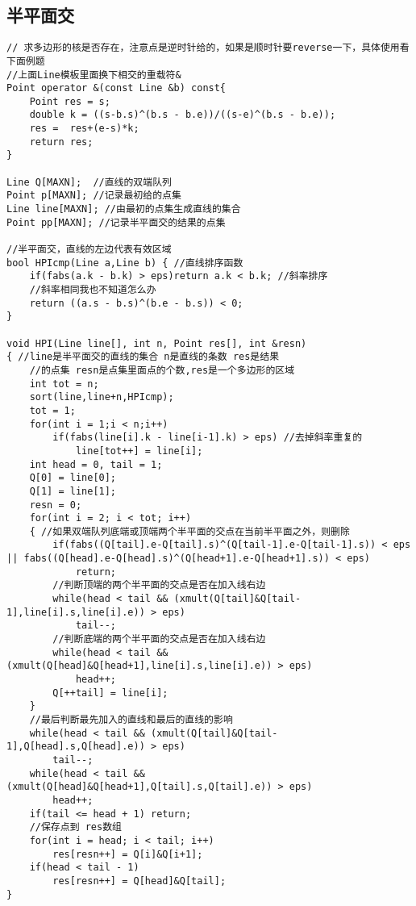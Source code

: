 \subsection{半平面交}
\begin{lstlisting}
// 求多边形的核是否存在，注意点是逆时针给的，如果是顺时针要reverse一下，具体使用看下面例题
//上面Line模板里面换下相交的重载符&
Point operator &(const Line &b) const{
	Point res = s;
	double k = ((s-b.s)^(b.s - b.e))/((s-e)^(b.s - b.e));
	res =  res+(e-s)*k;
	return res;
}

Line Q[MAXN];  //直线的双端队列
Point p[MAXN]; //记录最初给的点集
Line line[MAXN]; //由最初的点集生成直线的集合
Point pp[MAXN]; //记录半平面交的结果的点集

//半平面交，直线的左边代表有效区域
bool HPIcmp(Line a,Line b) { //直线排序函数
	if(fabs(a.k - b.k) > eps)return a.k < b.k; //斜率排序
	//斜率相同我也不知道怎么办
	return ((a.s - b.s)^(b.e - b.s)) < 0;
}

void HPI(Line line[], int n, Point res[], int &resn)
{ //line是半平面交的直线的集合 n是直线的条数 res是结果
	//的点集 resn是点集里面点的个数,res是一个多边形的区域
	int tot = n;
	sort(line,line+n,HPIcmp);
	tot = 1;
	for(int i = 1;i < n;i++)
		if(fabs(line[i].k - line[i-1].k) > eps) //去掉斜率重复的
			line[tot++] = line[i];
	int head = 0, tail = 1;
	Q[0] = line[0];
	Q[1] = line[1];
	resn = 0;
	for(int i = 2; i < tot; i++)
	{ //如果双端队列底端或顶端两个半平面的交点在当前半平面之外，则删除
		if(fabs((Q[tail].e-Q[tail].s)^(Q[tail-1].e-Q[tail-1].s)) < eps || fabs((Q[head].e-Q[head].s)^(Q[head+1].e-Q[head+1].s)) < eps)
			return;
		//判断顶端的两个半平面的交点是否在加入线右边
		while(head < tail && (xmult(Q[tail]&Q[tail-1],line[i].s,line[i].e)) > eps)
			tail--;
		//判断底端的两个半平面的交点是否在加入线右边
		while(head < tail && (xmult(Q[head]&Q[head+1],line[i].s,line[i].e)) > eps)
			head++;
		Q[++tail] = line[i];
	}
	//最后判断最先加入的直线和最后的直线的影响
	while(head < tail && (xmult(Q[tail]&Q[tail-1],Q[head].s,Q[head].e)) > eps)
		tail--;
	while(head < tail && (xmult(Q[head]&Q[head+1],Q[tail].s,Q[tail].e)) > eps)
		head++;
	if(tail <= head + 1) return;
	//保存点到 res数组
	for(int i = head; i < tail; i++)
		res[resn++] = Q[i]&Q[i+1];
	if(head < tail - 1)
		res[resn++] = Q[head]&Q[tail];
}
\end{lstlisting}


